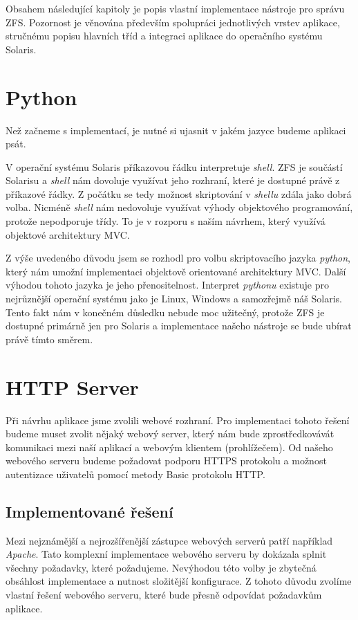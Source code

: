 Obsahem následující kapitoly je popis vlastní implementace nástroje pro správu ZFS. Pozornost je věnována především spolupráci jednotlivých vrstev aplikace, stručnému popisu hlavních tříd a integraci aplikace do operačního systému Solaris.
\section{Python}
Než začneme s implementací, je nutné si ujasnit v jakém jazyce budeme aplikaci psát.

V operační systému Solaris příkazovou řádku interpretuje \emph{shell}. ZFS je součástí Solarisu a \emph{shell} nám dovoluje využívat jeho rozhraní, které je dostupné právě z příkazové řádky. Z počátku se tedy možnost skriptování v \emph{shellu} zdála jako dobrá volba. Nicméně \emph{shell} nám nedovoluje využívat výhody objektového programování, protože nepodporuje třídy. To je v rozporu s naším návrhem, který využívá objektové architektury MVC.

Z výše uvedeného důvodu jsem se rozhodl pro volbu skriptovacího jazyka \emph{python}, který nám umožní implementaci objektově orientované architektury MVC. Další výhodou tohoto jazyka je jeho přenositelnost. Interpret \emph{pythonu} existuje pro nejrůznější operační systému jako je Linux, Windows a samozřejmě náš Solaris. Tento fakt nám v konečném důsledku nebude moc užitečný, protože ZFS je dostupné primárně jen pro Solaris a implementace našeho nástroje se bude ubírat právě tímto směrem.
\section{HTTP Server}
Při návrhu aplikace jsme zvolili webové rozhraní. Pro implementaci tohoto řešení budeme muset zvolit nějaký webový server, který nám bude zprostředkovávát komunikaci mezi naší aplikací a webovým klientem (prohlížečem). Od našeho webového serveru budeme požadovat podporu HTTPS protokolu a možnost autentizace uživatelů pomocí metody Basic protokolu HTTP.
    \subsection{Implementované řešení}
    Mezi nejznámější a nejrozšířenější zástupce webových serverů patří například \emph{Apache}. Tato komplexní implementace webového serveru by dokázala splnit všechny požadavky, které požadujeme. Nevýhodou této volby je zbytečná obsáhlost implementace a nutnost složitější konfigurace. Z tohoto důvodu zvolíme vlastní řešení webového serveru, které bude přesně odpovídat požadavkům aplikace.
